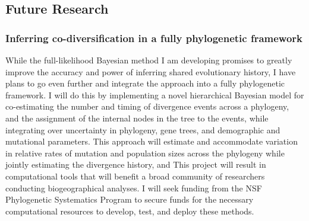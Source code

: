 
\subsection*{Future Research}


\subsubsection*{Inferring co-diversification in a fully phylogenetic framework}
While the full-likelihood Bayesian method I am developing promises to
greatly improve the accuracy and power of inferring shared evolutionary
history, I have plans to go even further and integrate the approach into a
fully phylogenetic framework.
I will do this by implementing a novel hierarchical Bayesian model for
co-estimating the number and timing of divergence events across a phylogeny,
and the assignment of the internal nodes in the tree to the events, while
integrating over uncertainty in phylogeny, gene trees, and demographic and
mutational parameters.
This approach will estimate and accommodate variation in relative rates of
mutation and population sizes across the phylogeny while jointly estimating the
divergence history, and
This project will result in computational tools that will benefit a broad
community of researchers conducting biogeographical analyses. I will seek
funding from the NSF Phylogenetic Systematics Program to secure funds for the
necessary computational resources to develop, test, and deploy these methods.

